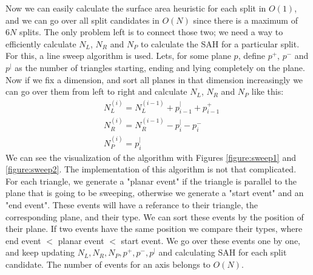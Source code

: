 \documentclass[12pt]{article}
\begin{document}
\indent Now we can easily calculate the surface area heuristic for each split in $O(1)$, and we can go over all split candidates in $O(N)$ since there is a maximum of $6N$ splits. The only problem left is to connect those two; we need a way to efficiently calculate $N_L$, $N_R$ and $N_P$ to calculate the SAH for a particular split. For this, a line sweep algorithm is used. Lets, for some plane $p$, define $p^+$, $p^-$ and $p^|$ as the number of triangles starting, ending and lying completely on the plane. Now if we fix a dimension, and sort all planes in that dimension increasingly we can go over them from left to right and calculate $N_L$, $N_R$ and $N_P$ like this:
\begin{align*}
& N_L^{(i)} = N_L^{(i-1)} + p_{i-1}^| + p_{i-1}^+\\
& N_R^{(i)} = N_R^{(i-1)} - p_i^| - p_i^-\\
& N_P^{(i)} = p_{i}^|
\end{align*}
\noindent We can see the visualization of the algorithm with Figures \ref{figure:sweep1} and \ref{figure:sweep2}. The implementation of this algorithm is not that complicated. For each triangle, we generate a "planar event" if the triangle is parallel to the plane that is going to be sweeping, otherwise we generate a "start event" and an "end event". These events will have a referance to their triangle, the corresponding plane, and their type. We can sort these events by the position of their plane. If two events have the same position we compare their types, where end event $<$ planar event $<$ start event. We go over these events one by one, and keep updating $N_L, N_R, N_P, p^+, p^-, p^|$ and calculating SAH for each split candidate. The number of events for an axis belongs to $O(N)$.
\end{document}
